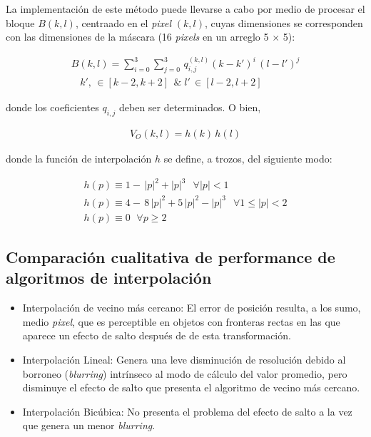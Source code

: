 %
La implementaci\'on de este m\'etodo puede llevarse a cabo por medio de
procesar el bloque $B(k, l)$, centraado en el \textit{pixel}
$(k, l)$, cuyas dimensiones se corresponden con las dimensiones de la m\'ascara 
(16 \textit{pixels} en un arreglo 5 $\times$ 5): 

\begin{eqnarray}
	B(k, l) = \sum _{i=0}^{3} \sum _{j=0}^{3} \, 
q^{(k, l)}_{i, j} (k - k')^{i} \, (l - l')^{j} \\ \nonumber
\, \, \; \; k', \,  \in [k - 2, k + 2] \; \, \& \; 
l' \,  \in [l - 2, l + 2]
\label{EqXXX}
\end{eqnarray}

donde los coeficientes $q_{i, j}$ deben ser determinados. 
%
O bien, 

\begin{eqnarray}
	V_{O}(k, l) = h(k) \, h(l) 
\label{EqXXXI}
\end{eqnarray}


donde la funci\'on de interpolaci\'on $h$ se define, a trozos, del siguiente modo:

\begin{eqnarray}
	h(p) \equiv 1 - \, \lvert p \rvert^{2} + \lvert p \rvert^{3} \; \, \; \forall \lvert p \rvert < 1 \nonumber \\
	h(p) \equiv 4 - \, 8 \, \lvert p \rvert^{2} + 5 \, \lvert p \rvert^{2} - \lvert p \rvert^{3} \; \, \; \forall 1 \leq \lvert p \rvert < 2 \\
	h(p) \equiv 0 \, \; \, \forall p \geq 2 \nonumber
\label{EqXXXII}
\end{eqnarray}


\subsection{Comparaci\'on cualitativa de performance de algoritmos de  interpolaci\'on}

\begin{itemize}
 \item Interpolaci\'on de vecino m\'as cercano: El error de posici\'on resulta, a los sumo, medio \textit{pixel}, que es perceptible en objetos con
fronteras rectas en las que aparece un efecto de salto despu\'es de de esta transformaci\'on.
 \item Interpolaci\'on Lineal: Genera una leve disminuci\'on de resoluci\'on debido al borroneo (\textit{blurring}) intr\'inseco al modo de c\'alculo 
 del valor promedio, pero disminuye el efecto de salto que presenta el algoritmo de vecino m\'as cercano.
 \item Interpolaci\'on Bic\'ubica: No presenta el problema del efecto de salto a la vez que genera un menor \textit{blurring}.
\end{itemize}


